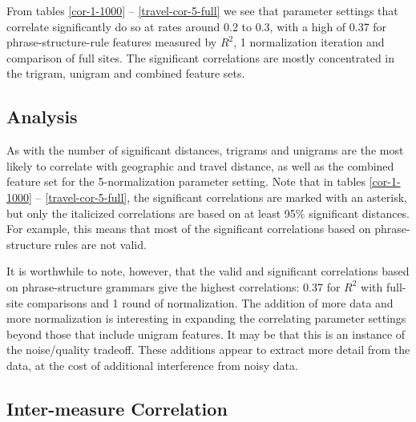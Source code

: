From tables \ref{cor-1-1000} -- \ref{travel-cor-5-full} we see that parameter settings that correlate
significantly do so at rates around 0.2 to 0.3, with a high of 0.37
for phrase-structure-rule features measured by $R^2$, 1 normalization
iteration and comparison of full sites.  The significant
correlations are mostly concentrated in the trigram, unigram and
combined feature sets.

\subsection{Analysis}

As with the number of significant distances, trigrams and unigrams are
the most likely to correlate with geographic and travel distance,
as well as the combined feature set for the 5-normalization parameter
setting.
Note that in tables \ref{cor-1-1000} --
\ref{travel-cor-5-full}, the significant correlations are marked with
an asterisk, but only the italicized correlations are based on at
least 95\% significant distances. For example, this means that most of
the significant correlations based on phrase-structure rules are not valid.

It is worthwhile to note, however, that the valid and significant
correlations based on phrase-structure grammars give the highest
correlations: 0.37 for $R^2$ with full-site comparisons and 1 round
of normalization.
The addition of more data and more normalization is interesting in
expanding the correlating parameter settings beyond those that include
unigram features. It may be that this is an instance of the noise/quality tradeoff.
These additions appear to extract more detail from
the data, at the cost of additional interference from noisy data.


\subsection{Inter-measure Correlation}
\label{results-chapter-inter-measure-correlation}

